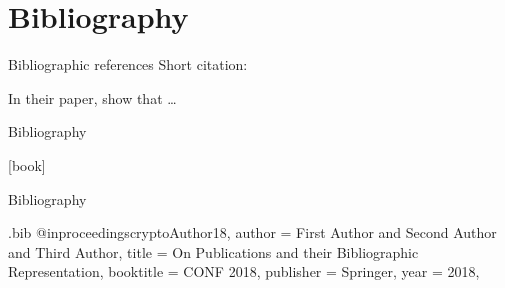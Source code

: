 \documentclass[table,aspectratio=43]{beamer}
\begin{document}
\section{Bibliography}

\begin{frame}{Bibliographic references}
  Short citation: \cite{cryptoAuthor18}

  In their paper, \textcite{cryptoAuthor18} show that \dots %
\end{frame}

\begin{frame}[allowframebreaks]{Bibliography}
  \printbibliography
\end{frame}

[book]
\begin{frame}[allowframebreaks]{Bibliography}
  \printbibliography
\end{frame}

\begin{filecontents*}{\jobname.bib}
@inproceedings{cryptoAuthor18,
  author       = {First Author and
                  Second Author and
                  Third Author},
  title        = {On Publications and their Bibliographic Representation},
  booktitle    = {CONF 2018},
  publisher    = {Springer},
  year         = {2018},
}
\end{filecontents*}
\end{document}
